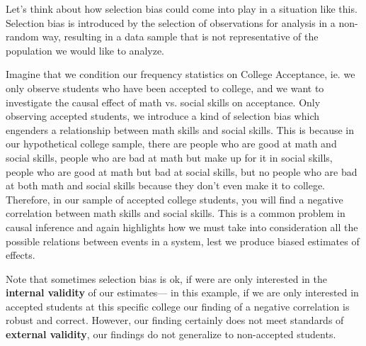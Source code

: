 \begin{center}
\end{center}

Let's think about how selection bias could come into play in a situation like this. Selection bias is introduced by the selection of observations for analysis in a non-random way, resulting in a data sample that is not representative of the population we would like to analyze.  

Imagine that we condition our frequency statistics on College Acceptance, ie. we only observe students who have been accepted to college, and we want to investigate the causal effect of math vs. social skills on acceptance. Only observing accepted students, we introduce a kind of selection bias which engenders a relationship between math skills and social skills. This is because in our hypothetical college sample, there are people who are good at math and social skills, people who are bad at math  but make up for it in social skills, people who are good at math but bad at social skills, but no people who are bad at both math and social skills because they don’t even make it to college. Therefore, in our sample of accepted college students, you will find a negative correlation between math skills and social skills. This is a common problem in causal inference and again highlights how we must take into consideration all the possible relations between events in a system, lest we produce biased estimates of effects.

Note that sometimes selection bias is ok, if were are only interested in the \textbf{internal validity} of our estimates–– in this example, if we are only interested in accepted students at this specific college our finding of a negative correlation is robust and correct. However, our finding certainly does not meet standards of \textbf{external validity}, our findings do not generalize to non-accepted students.

